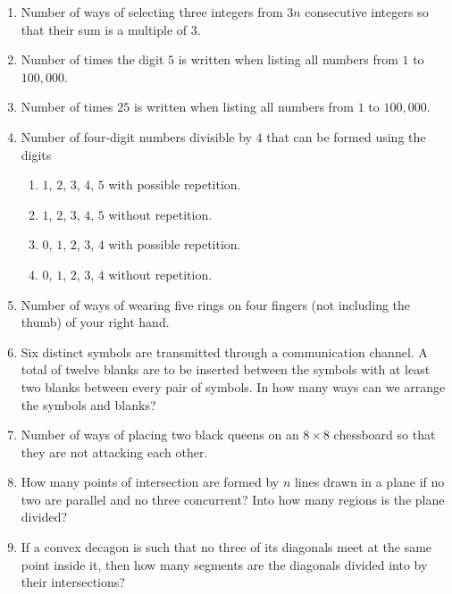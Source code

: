 \documentclass[svgnames]{amsart}
\begin{document}
\begin{enumerate}[leftmargin=*]
\item Number of ways of selecting three integers from $3n$ consecutive integers so that their sum is a multiple of $3$.

\item Number of times the digit $5$ is written when listing all numbers from $1$ to $100,000$.

\item Number of times $25$ is written when listing all numbers from $1$ to $100,000$.

\item Number of four-digit numbers divisible by $4$ that can be formed using the digits
\begin{enumerate}[label=(\roman*)]
	\item $1$, $2$, $3$, $4$, $5$ with possible repetition.
	\item $1$, $2$, $3$, $4$, $5$ without repetition.
	\item $0$, $1$, $2$, $3$, $4$ with possible repetition.
	\item $0$, $1$, $2$, $3$, $4$ without repetition.	
\end{enumerate}

\item Number of ways of wearing five rings on four fingers (not including the thumb) of your right hand.

\item Six distinct symbols are transmitted through a communication channel. A total of twelve blanks are to be inserted between the symbols with at least two blanks between every pair of symbols. In how many ways can we arrange the symbols and blanks?

\item Number of ways of placing two black queens on an $8 \times 8$ chessboard so that they are not attacking each other.

\item How many points of intersection are formed by $n$ lines drawn in a plane if no two are parallel and no three concurrent? Into how many regions is the plane divided?

\item If a convex decagon is such that no three of its diagonals meet at the same point inside it, then how many segments are the diagonals divided into by their intersections?
\end{enumerate}
\end{document}
